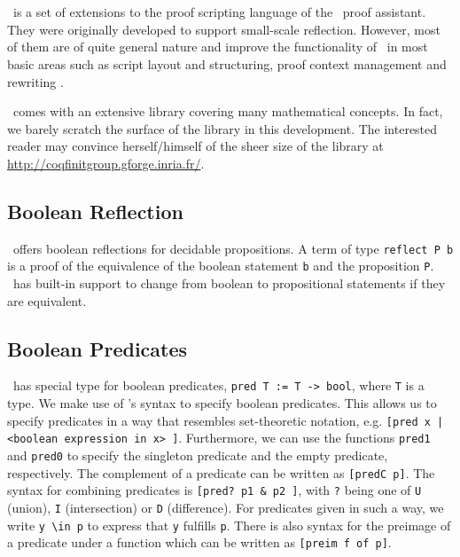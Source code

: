 \section{\ssreflect}


\ssreflect\ is a set of extensions to the proof scripting language of the \coq\ proof assistant. 
They were originally developed to support small-scale reflection. 
However, most of them are of quite general nature and improve the functionality of \coq\ in most basic areas such as script layout and structuring, proof context management and rewriting \cite{gonthier:inria-00258384}.

\ssreflect\ comes with an extensive library covering many mathematical concepts. 
In fact, we barely scratch the surface of the library in this development. 
The interested reader may convince herself/himself of the sheer size of the library at \url{http://coqfinitgroup.gforge.inria.fr/}.

\subsection{Boolean Reflection}
\ssreflect\ offers boolean reflections for decidable propositions. 
A term of type \lstinline{reflect P b} is a proof of the equivalence of the boolean statement \lstinline{b} and the proposition \lstinline{P}.
\ssreflect\ has built-in support to change from boolean to propositional statements if they are equivalent. 


\subsection{Boolean Predicates}
\ssreflect\ has special type for boolean predicates, \lstinline{pred T := T -> bool}, where \lstinline{T} is a type.
We make use of \ssreflect's syntax to specify boolean predicates.
This allows us to specify predicates in a way that resembles set-theoretic notation, e.g. 
\lstinline{[pred x | <boolean expression in x> ]}.
Furthermore, we can use the functions \lstinline{pred1} and \lstinline{pred0} to specify the singleton predicate and the empty predicate, respectively.
The complement of a predicate can be written as \lstinline{[predC p]}. 
The syntax for combining predicates is \lstinline{[pred? p1 & p2 ]}, with \lstinline{?} being one of 
\lstinline{U} (union), \lstinline{I} (intersection) or \lstinline{D} (difference).
For predicates given in such a way, we write \lstinline{y \in p} to express that \lstinline{y} fulfills \lstinline{p}.
There is also syntax for the preimage of a predicate under a function
which can be written as \lstinline{[preim f of p]}.

